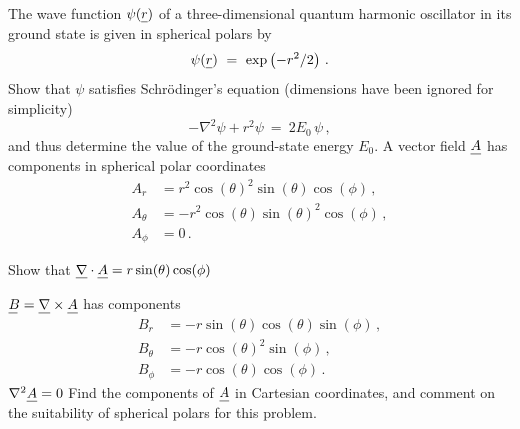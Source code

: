 \begin{ExerciseList}
  The wave function $\psi(\v{r})$ of a three-dimensional quantum harmonic oscillator in its
  ground state is given in spherical polars by
  \[
    \psi(\v{r})
    ~=~
    \exp \left( - r^2/2 \right) \,.
  \]
  Show that $\psi$ satisfies Schr\"odinger's equation (dimensions have been ignored for
  simplicity)
  \[
    -\nabla^2 \psi + r^2 \psi
    ~=~
    2E_0 \, \psi \,,
  \]
  and thus determine the value of the ground-state energy $E_0$.
  \Exercise A vector field $\v{A}$
  has components in spherical polar coordinates
  \begin{align*}
    A_{r}      & = r^{2}\cos(\theta)^2\sin(\theta)\cos(\phi) \,,  \\
    A_{\theta} & = -r^{2}\cos(\theta)\sin(\theta)^2\cos(\phi) \,, \\
    A_{\phi}   & = 0 \, .
  \end{align*}

  \Question Show that
  \subQuestion $\Div\v{A}=r\sin(\theta)\cos(\phi)$

  \subQuestion $\vB=\curl\v{A}$ has
  components
  \begin{align*}
    B_{r}      & =-r\sin(\theta)\cos(\theta)\sin(\phi) \,, \\
    B_{\theta} & =-r\cos(\theta)^2\sin(\phi) \,,           \\
    B_{\phi}   & = -r\cos(\theta)\cos(\phi) \,.
  \end{align*}
  \subQuestion $\nabla^{2}\v{A} = 0$
  \Question Find the components of $\v{A}$ in Cartesian coordinates, and comment on
  the suitability of spherical polars for this problem.

  \vfill
\end{ExerciseList}